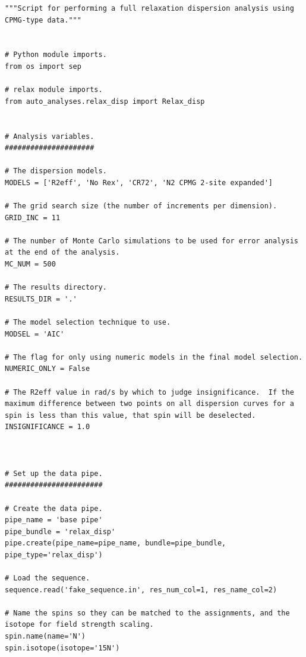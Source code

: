 \begin{lstlisting}
"""Script for performing a full relaxation dispersion analysis using CPMG-type data."""


# Python module imports.
from os import sep

# relax module imports.
from auto_analyses.relax_disp import Relax_disp


# Analysis variables.
#####################

# The dispersion models.
MODELS = ['R2eff', 'No Rex', 'CR72', 'N2 CPMG 2-site expanded']

# The grid search size (the number of increments per dimension).
GRID_INC = 11

# The number of Monte Carlo simulations to be used for error analysis at the end of the analysis.
MC_NUM = 500

# The results directory.
RESULTS_DIR = '.'

# The model selection technique to use.
MODSEL = 'AIC'

# The flag for only using numeric models in the final model selection.
NUMERIC_ONLY = False

# The R2eff value in rad/s by which to judge insignificance.  If the maximum difference between two points on all dispersion curves for a spin is less than this value, that spin will be deselected.
INSIGNIFICANCE = 1.0



# Set up the data pipe.
#######################

# Create the data pipe.
pipe_name = 'base pipe'
pipe_bundle = 'relax_disp'
pipe.create(pipe_name=pipe_name, bundle=pipe_bundle, pipe_type='relax_disp')

# Load the sequence.
sequence.read('fake_sequence.in', res_num_col=1, res_name_col=2)

# Name the spins so they can be matched to the assignments, and the isotope for field strength scaling.
spin.name(name='N')
spin.isotope(isotope='15N')


\end{lstlisting}
